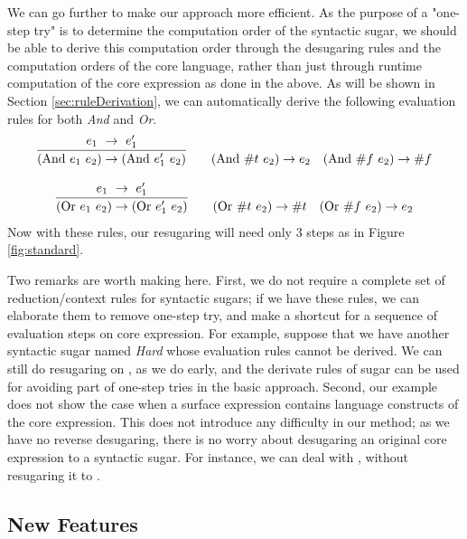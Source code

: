 We can go further to make our approach more efficient. As the purpose of a "one-step try" is to determine the computation order of the syntactic sugar, we should be able to derive this computation order through the desugaring rules and the computation orders of the core language, rather than just through runtime computation of the core expression as done in the above. As will be shown in Section \ref{sec:ruleDerivation}, we can automatically derive the following evaluation rules for both \emph{And} and \emph{Or}.
\[
\begin{array}{c}
\infer {(\mbox{And}~e_1~e_2) \rightarrow (\mbox{And}~e_1'~e_2)} {e_1~ \rightarrow~e_1'}
\qquad
(\mbox{And}~\#t~e_2) \rightarrow e_2
\quad
(\mbox{And}~\#f~e_2) \rightarrow \#f \\
\\
\infer {(\mbox{Or}~e_1~e_2) \rightarrow (\mbox{Or}~e_1'~e_2)} {e_1~ \rightarrow~e_1'}
\qquad
(\mbox{Or}~\#t~e_2) \rightarrow \#t
\quad
(\mbox{Or}~\#f~e_2) \rightarrow e_2 \\
\end{array}
\]
Now with these rules, our resugaring will need only $3$ steps as in Figure \ref{fig:standard}.

Two remarks are worth making here. First, we do not require a complete set of reduction/context rules for syntactic sugars; if we have these rules, we can elaborate them to remove one-step try, and make a shortcut for a sequence of evaluation steps on core expression.
For example, suppose that we have another syntactic sugar named \emph{Hard} whose evaluation rules cannot be derived.
We can still do resugaring on , as we do early, and the derivate rules of  sugar can be used for avoiding part of one-step tries in the basic approach.
Second, our example does not show the case when a surface expression contains language constructs of the core expression. This does not introduce any difficulty in our method; as we have no reverse desugaring, there is no worry about desugaring an original core expression to a syntactic sugar. For instance, we can deal with , without resugaring it to .


\subsection{New Features}

